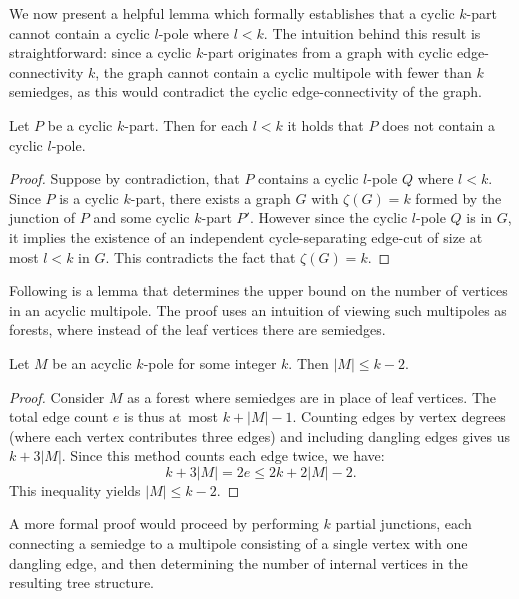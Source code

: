 \documentclass[12pt, twoside]{book}
\begin{document}
We now present a helpful lemma which formally establishes that a cyclic $k$-part cannot contain a cyclic $l$-pole where $l<k$. The intuition behind this result is straightforward: since a cyclic $k$-part originates from a graph with cyclic edge-connectivity $k$, the graph cannot contain a cyclic multipole with fewer than $k$ semiedges, as this would contradict the cyclic edge-connectivity of the graph.

\begin{lemma}\label{lem:cyclic-part-no-small-cyclic-l-pole}
	Let $P$ be a cyclic $k$-part. Then for each $l<k$ it holds that $P$ does not contain a cyclic $l$-pole.
\end{lemma}

\begin{proof}
	Suppose by contradiction, that $P$ contains a cyclic $l$-pole $Q$ where $l<k$. Since $P$ is a cyclic $k$-part, there exists a graph $G$ with $\zeta(G)=k$ formed by the junction of $P$ and some cyclic $k$-part $P'$. However since the cyclic $l$-pole $Q$ is in $G$, it implies the existence of an independent cycle-separating edge-cut of size at most $l<k$ in $G$. This contradicts the fact that $\zeta(G)=k$.
\end{proof}

Following is a lemma that determines the upper bound on the number of vertices in an acyclic multipole. The proof uses an intuition of viewing such multipoles as forests, where instead of the leaf vertices there are semiedges.

\begin{lemma}\label{lem:number-of-vertices-in-acyclic-k-pole}
	Let $M$ be an acyclic $k$-pole for some integer $k$. Then $|M|\leq k-2$. 
\end{lemma}

\begin{proof}
	Consider $M$ as a forest where semiedges are in place of leaf vertices. The total edge count $e$ is thus at~most $k+|M|-1$. Counting edges by vertex degrees (where each vertex contributes three edges) and including dangling edges gives us $k+3|M|$. Since this method counts each edge twice, we have:
	$$k+3|M|=2e\leq 2k+2|M|-2.$$
	This inequality yields $|M|\leq k-2$.
\end{proof}

A more formal proof would proceed by performing $k$ partial junctions, each connecting a semiedge to a multipole consisting of a single vertex with one dangling edge, and then determining the number of internal vertices in the resulting tree structure.
\end{document}
